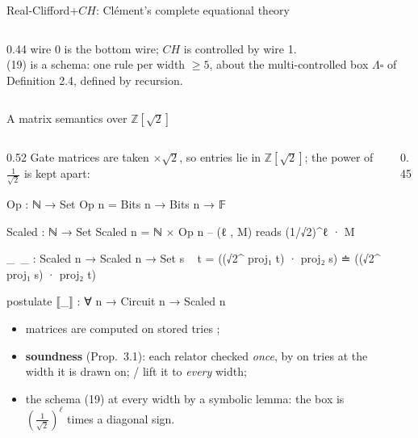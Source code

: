 \begin{frame}{Real-Clifford+$CH$: Clément's complete equational theory \New}
\begin{columns}[c]
\begin{column}{0.44\textwidth}
\vspace{6pt}
{\scriptsize wire 0 is the bottom wire; $CH$ is controlled by wire 1.\\
(19) is a \alert{schema}: one rule per width $\ge5$, about the multi-controlled
box $\Lambda\square$ of Definition 2.4, defined by recursion.}
\end{column}
\end{columns}
\end{frame}

\begin{frame}{A matrix semantics over $\mathbb{Z}[\sqrt2]$ \New}
\begin{columns}[c]
\begin{column}{0.52\textwidth}
\renewcommand{\AgdaCodeStyle}{\scriptsize}
\small Gate matrices are taken $\times\sqrt2$, so entries lie in
$\mathbb{Z}[\sqrt2]$; the power of $\frac1{\sqrt2}$ is kept apart:
\begin{code}
Op : ℕ → Set
Op n = Bits n → Bits n → 𝔽

Scaled : ℕ → Set
Scaled n = ℕ × Op n          -- (ℓ , M)  reads  (1/√2)^ℓ · M

_~_ : Scaled n → Scaled n → Set
s ~ t = ((√2^ proj₁ t) · proj₂ s) ≐ ((√2^ proj₁ s) · proj₂ t)
\end{code}
\begin{code}[hide]
postulate ⟦_⟧ : ∀ {n} → Circuit n → Scaled n
\end{code}
\begin{itemize}
  \item matrices are computed on stored \alert{tries} ;
  \item \textbf{soundness} (Prop.\ 3.1): each relator checked \emph{once}, by
         on tries at the width it is drawn on;  /
         lift it to \emph{every} width;
  \item the schema (19) at every width by a symbolic lemma: the box is
        $(\frac1{\sqrt2})^\ell$ times a diagonal sign.
\end{itemize}
\end{column}
\begin{column}{0.45\textwidth}
\centering
{}


\end{column}
\end{columns}
\end{frame}
